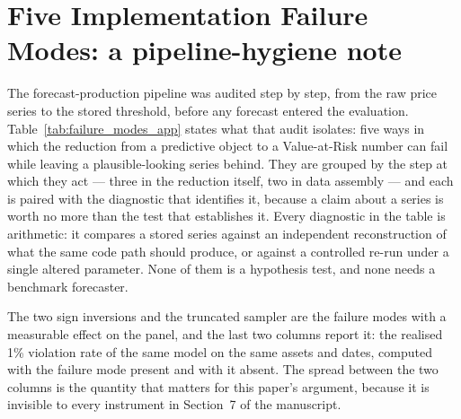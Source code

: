 \documentclass[preprint,11pt,authoryear]{elsarticle}
\newcommand{\1}{\boldsymbol{1}}
\begin{document}
\section{Five Implementation Failure Modes: a pipeline-hygiene note}
\label{app:failure_modes}

The forecast-production pipeline was audited step by step, from the raw price
series to the stored threshold, before any forecast entered the evaluation.
Table~\ref{tab:failure_modes_app} states what that audit isolates: five ways in which
the reduction from a predictive object to a Value-at-Risk number can fail while
leaving a plausible-looking series behind. They are grouped by the step at which
they act --- three in the reduction itself, two in data assembly --- and each is
paired with the diagnostic that identifies it, because a claim about a series is
worth no more than the test that establishes it. Every diagnostic in the table is
arithmetic: it compares a stored series against an independent reconstruction of
what the same code path should produce, or against a controlled re-run under a
single altered parameter. None of them is a hypothesis test, and none needs a
benchmark forecaster.

The two sign inversions and the truncated sampler are the failure modes with a
measurable effect on the panel, and the last two columns report it: the realised 1\%
violation rate of the same model on the same assets and dates, computed with the
failure mode present and with it absent. The spread between the two columns is
the quantity that matters for this paper's argument, because it is invisible to
every instrument in Section~7 of the manuscript.
\end{document}
